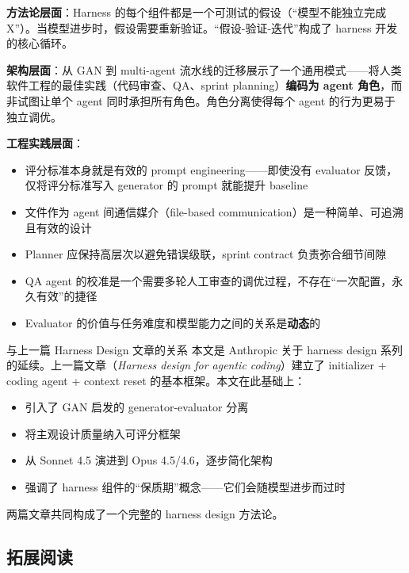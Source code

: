 \textbf{方法论层面}：Harness 的每个组件都是一个可测试的假设（``模型不能独立完成 X''）。当模型进步时，假设需要重新验证。``假设-验证-迭代''构成了 harness 开发的核心循环。

\textbf{架构层面}：从 GAN 到 multi-agent 流水线的迁移展示了一个通用模式——将人类软件工程的最佳实践（代码审查、QA、sprint planning）\textbf{编码为 agent 角色}，而非试图让单个 agent 同时承担所有角色。角色分离使得每个 agent 的行为更易于独立调优。

\textbf{工程实践层面}：
\begin{itemize}[leftmargin=1.5em]
    \item 评分标准本身就是有效的 prompt engineering——即使没有 evaluator 反馈，仅将评分标准写入 generator 的 prompt 就能提升 baseline
    \item 文件作为 agent 间通信媒介（file-based communication）是一种简单、可追溯且有效的设计
    \item Planner 应保持高层次以避免错误级联，sprint contract 负责弥合细节间隙
    \item QA agent 的校准是一个需要多轮人工审查的调优过程，不存在``一次配置，永久有效''的捷径
    \item Evaluator 的价值与任务难度和模型能力之间的关系是\textbf{动态}的
\end{itemize}

\begin{knowledgebox}{与上一篇 Harness Design 文章的关系}
本文是 Anthropic 关于 harness design 系列的延续。上一篇文章（\textit{Harness design for agentic coding}）建立了 initializer + coding agent + context reset 的基本框架。本文在此基础上：
\begin{itemize}[leftmargin=1.5em]
    \item 引入了 GAN 启发的 generator-evaluator 分离
    \item 将主观设计质量纳入可评分框架
    \item 从 Sonnet 4.5 演进到 Opus 4.5/4.6，逐步简化架构
    \item 强调了 harness 组件的``保质期''概念——它们会随模型进步而过时
\end{itemize}
两篇文章共同构成了一个完整的 harness design 方法论。
\end{knowledgebox}

\subsection{拓展阅读}

